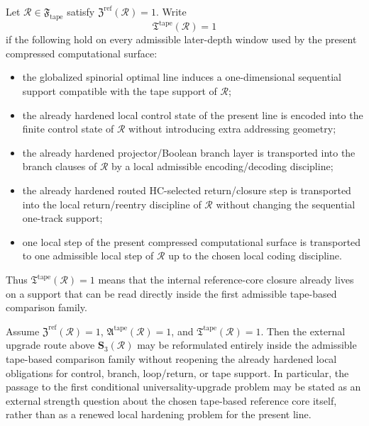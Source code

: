 \begin{definition}
Let \(\mathcal R\in\mathfrak F_{\mathrm{tape}}\) satisfy \(\mathfrak Z^{\mathrm{ref}}(\mathcal R)=1\). Write
\[
\mathfrak T^{\mathrm{tape}}(\mathcal R)=1
\]
if the following hold on every admissible later-depth window used by the present compressed computational surface:
\begin{itemize}[leftmargin=2em]
  \item the globalized spinorial optimal line induces a one-dimensional sequential support compatible with the tape support of \(\mathcal R\);
  \item the already hardened local control state of the present line is encoded into the finite control state of \(\mathcal R\) without introducing extra addressing geometry;
  \item the already hardened projector/Boolean branch layer is transported into the branch clauses of \(\mathcal R\) by a local admissible encoding/decoding discipline;
  \item the already hardened routed HC-selected return/closure step is transported into the local return/reentry discipline of \(\mathcal R\) without changing the sequential one-track support;
  \item one local step of the present compressed computational surface is transported to one admissible local step of \(\mathcal R\) up to the chosen local coding discipline.
\end{itemize}
Thus \(\mathfrak T^{\mathrm{tape}}(\mathcal R)=1\) means that the internal reference-core closure already lives on a support that can be read directly inside the first admissible tape-based comparison family.
\end{definition}

\begin{proposition}
Assume \(\mathfrak Z^{\mathrm{ref}}(\mathcal R)=1\), \(\mathfrak A^{\mathrm{tape}}(\mathcal R)=1\), and \(\mathfrak T^{\mathrm{tape}}(\mathcal R)=1\). Then the external upgrade route above \(\mathbf S_3(\mathcal R)\) may be reformulated entirely inside the admissible tape-based comparison family without reopening the already hardened local obligations for control, branch, loop/return, or tape support. In particular, the passage to the first conditional universality-upgrade problem may be stated as an external strength question about the chosen tape-based reference core itself, rather than as a renewed local hardening problem for the present line.
\end{proposition}

